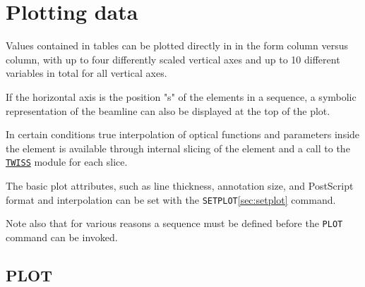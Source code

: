 
\chapter{Plotting data}
\label{chap:plot}

Values contained in \madx tables can be plotted directly in \madx in the
form column versus column, with up to four differently scaled vertical
axes and up to 10 different variables in total for all vertical axes.

If the horizontal axis is the position "s" of the elements
in a sequence, a symbolic representation of the beamline can also
be displayed at the top of the plot. 

In certain conditions true interpolation of optical functions and
parameters inside the element is available through internal slicing of
the element and a call to the \hyperref[chap:twiss]{\tt TWISS} module
for each slice. 

The basic plot attributes, such as line thickness, annotation size,
and PostScript format and interpolation can be set with the
\texttt{SETPLOT}\ref{sec:setplot} command.   

Note also that for various reasons a sequence must be defined before the 
\texttt{PLOT} command can be invoked. 

\section{PLOT}	
\label{sec:plot}


